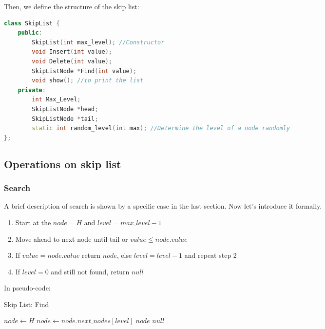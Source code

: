Then, we define the structure of the skip list:
\begin{lstlisting}[language=C++]
class SkipList {
    public:
        SkipList(int max_level); //Constructor
        void Insert(int value);
        void Delete(int value);
        SkipListNode *Find(int value);
        void show(); //to print the list
    private:
        int Max_Level;
        SkipListNode *head;
        SkipListNode *tail;
        static int random_level(int max); //Determine the level of a node randomly
};
\end{lstlisting}

\subsection{Operations on skip list}

\subsubsection{Search}
A brief description of search is shown by a specific case in the last section. Now let's introduce it formally.\par
\begin{enumerate}
    \item Start at the $node = H$ and $level = max\_level - 1$
    \item Move ahead to next node until tail or $value \leq node.value$
    \item If $value = node.value$ return $node$, else $level = level - 1$ and repeat step 2
    \item If $level = 0$ and still not found, return $null$
\end{enumerate}
In pseudo-code:
\begin{algorithm}[H]
    \caption{Skip List: Find}
    \begin{algorithmic}[1]
            \State $node \gets H$
                    \State $node \gets node.next\_nodes[level]$
                \EndWhile
                    \State \Return $node$
                \EndIf
            \EndFor
            \State \Return $null$
		\EndProcedure
	\end{algorithmic}
\end{algorithm}

